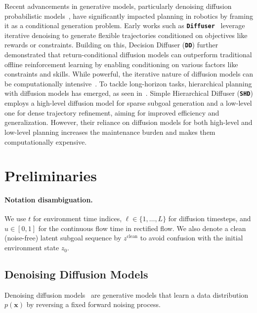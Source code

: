 \documentclass{article} %
\begin{document}
Recent advancements in generative models, particularly denoising diffusion probabilistic models~\citep{sohl2015deep,ho2020denoising,song2021scorebased,karras2022elucidating}, have significantly impacted planning in robotics by framing it as a conditional generation problem. Early works such as \texttt{\textbf{Diffuser}}~\citep{janner2022planning} leverage iterative denoising to generate flexible trajectories conditioned on objectives like rewards or constraints. Building on this, Decision Diffuser (\texttt{\textbf{DD}})\citep{ajayconditional} further demonstrated that return-conditional diffusion models can outperform traditional offline reinforcement learning by enabling conditioning on various factors like constraints and skills. While powerful, the iterative nature of diffusion models can be computationally intensive~\citep{dong2024diffuserlite}. To tackle long-horizon tasks, hierarchical planning with diffusion models has emerged, as seen in~\citep{li2023hierarchical,chensimple,hao2025chd}. Simple Hierarchical Diffuser (\texttt{\textbf{SHD}})\citep{chensimple} employs a high-level diffusion model for sparse subgoal generation and a low-level one for dense trajectory refinement, aiming for improved efficiency and generalization. However, their reliance on diffusion models for both high-level and low-level planning increases the maintenance burden and makes them computationally expensive.

\section{Preliminaries}
\vspace{-8pt}
\paragraph{Notation disambiguation.} We use $t$ for environment time indices, $\ell \in \{1, \dots, L\}$ for diffusion timesteps, and $u \in [0,1]$ for the continuous flow time in rectified flow. We also denote a clean (noise-free) latent subgoal sequence by $z^{\text{clean}}$ to avoid confusion with the initial environment state $z_0$.

\subsection{Denoising Diffusion Models}
\vspace{-5pt}
Denoising diffusion models~\citep{sohl2015deep, ho2020denoising} are generative models that learn a data distribution $p(\mathbf{x})$ by reversing a fixed forward noising process.
\end{document}
